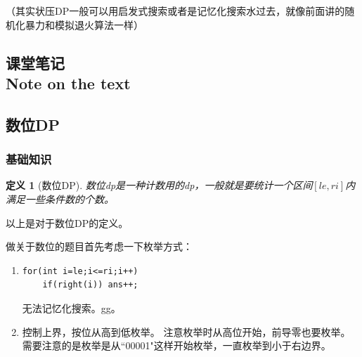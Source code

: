 \documentclass{article}
\newtheorem{definition}{定义}[subsection]
\theoremstyle{nonumberplain}
\newcommand{\note}{\ \par
	\subsection*{课堂笔记\\\tiny{Note on the text}}
	\newpage}
\begin{document}
	（其实状压DP一般可以用启发式搜索或者是记忆化搜索水过去，就像前面讲的随机化暴力和模拟退火算法一样）
	\note
	\subsection{数位DP}
	\subsubsection{基础知识}
	\begin{definition}[数位DP]数位dp是一种计数用的dp，一般就是要统计一个区间$[le,ri]$内满足一些条件数的个数。
	\end{definition}
	以上是对于数位DP的定义。

	做关于数位的题目首先考虑一下枚举方式：
	\begin{enumerate}
		\item{\begin{verbatim}
for(int i=le;i<=ri;i++)  
    if(right(i)) ans++;
\end{verbatim}
		      无法记忆化搜索。gg。}
		\item{控制上界，按位从高到低枚举。
		      注意枚举时从高位开始，前导零也要枚举。
		      需要注意的是枚举是从``00001"这样开始枚举，一直枚举到小于右边界。}
	\end{enumerate}
	
\end{document}

